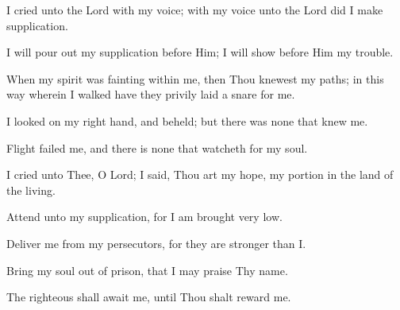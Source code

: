I cried unto the Lord with my voice; with my voice unto the Lord did I make supplication.

I will pour out my supplication before Him; I will show before Him my trouble.

When my spirit was fainting within me, then Thou knewest my paths; in this way wherein I walked have they privily laid a snare for me.

I looked on my right hand, and beheld; but there was none that knew me.

Flight failed me, and there is none that watcheth for my soul.

I cried unto Thee, O Lord; I said, Thou art my hope, my portion in the land of the living.

Attend unto my supplication, for I am brought very low.

Deliver me from my persecutors, for they are stronger than I.

Bring my soul out of prison, that I may praise Thy name.

The righteous shall await me, until Thou shalt reward me.
